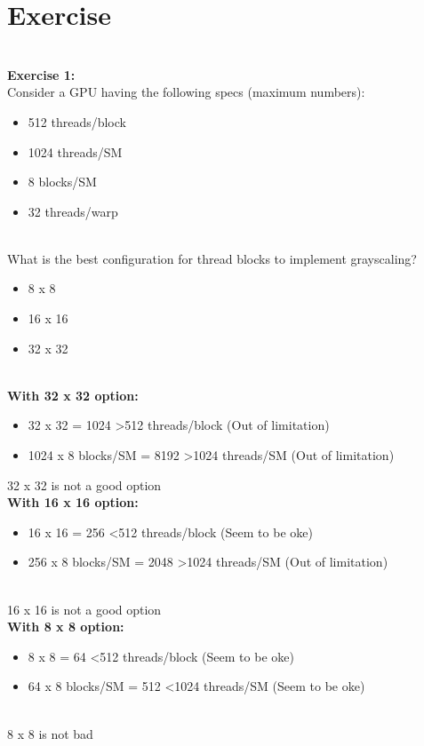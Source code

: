 \documentclass{article}
\begin{document}
\section*{Exercise}
\\
\textbf{Exercise 1:}
\\
Consider a GPU having the following specs (maximum numbers):
\\
\begin{itemize}
\item 512 threads/block
\item 1024 threads/SM
\item 8 blocks/SM
\item 32 threads/warp
\end{itemize}
\\
What is the best configuration for thread blocks to implement
grayscaling?
\\
\begin{itemize}
\item 8 x 8 
\item 16 x 16 
\item 32 x 32 
\end{itemize}
\\
\textbf{With 32 x 32 option:}
\begin{itemize}
\item 32 x 32 = 1024 \textgreater 512 threads/block (Out of limitation)
\item 1024 x 8 blocks/SM = 8192 \textgreater 1024 threads/SM (Out of limitation)
\end{itemize}
32 x 32 is not a good option
\\
\textbf{With 16 x 16 option:}
\begin{itemize}
\item 16 x 16 = 256 \textless 512 threads/block (Seem to be oke)
\item 256 x 8 blocks/SM = 2048 \textgreater 1024 threads/SM (Out of limitation)
\end{itemize}
\\
16 x 16 is not a good option
\\
\textbf{With 8 x 8 option:}
\begin{itemize}
\item 8 x 8 = 64 \textless 512 threads/block (Seem to be oke)
\item 64 x 8 blocks/SM = 512 \textless 1024 threads/SM (Seem to be oke)
\end{itemize}
\\
8 x 8 is not bad
\\
\end{document}
